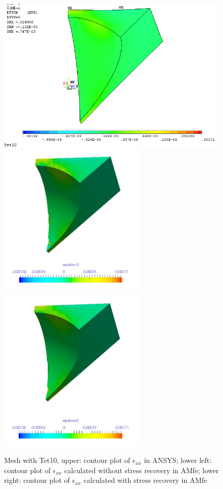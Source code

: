 \begin{figure}[htbp]
	\begin{center}
		\includegraphics[width=11cm,clip]{Tet10_Exx.png}
		\includegraphics[width=7cm,clip]{Tet10_Exx_PD.png}  		
		\includegraphics[width=7cm,clip]{Tet10_Exx_P.png} 		
		\caption{Mesh with Tet10, upper: contour plot of $\epsilon_{xx}$ in ANSYS; lower left: contour plot of $\epsilon_{xx}$ calculated without stress recovery in AMfe; lower right: contour plot of $\epsilon_{xx}$ calculated with stress recovery in AMfe} \label{fig: Tet10_Exx}
	\end{center}
\end{figure}
\clearpage 

